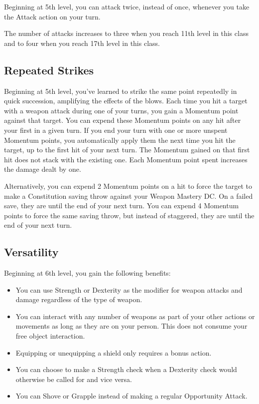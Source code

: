 Beginning at 5th level, you can attack twice, instead of once, whenever you take the Attack action on your turn.

The number of attacks increases to three when you reach 11th level in this class and to four when you reach 17th level in this class.

\subsection{Repeated Strikes}

Beginning at 5th level, you've learned to strike the same point repeatedly in quick succession, amplifying the effects of the blows. Each time you hit a target with a weapon attack during one of your turns, you gain a Momentum point against that target. You can expend these Momentum points on any hit after your first in a given turn. If you end your turn with one or more unspent Momentum points, you automatically apply them the next time you hit the target, up to the first hit of your next turn. The Momentum gained on that first hit does not stack with the existing one. Each Momentum point spent increases the damage dealt by one.

Alternatively, you can expend 2 Momentum points on a hit to force the target to make a Constitution saving throw against your Weapon Mastery DC. On a failed save, they are  until the end of your next turn. You can expend 4 Momentum points to force the same saving throw, but instead of staggered, they are  until the end of your next turn.

\subsection{Versatility}
Beginning at 6th level, you gain the following benefits:
\begin{itemize}
	\item You can use Strength or Dexterity as the modifier for weapon attacks and damage regardless of the type of weapon.
	\item You can interact with any number of weapons as part of your other actions or movements as long as they are on your person. This does not consume your free object interaction.
	\item Equipping or unequipping a shield only requires a bonus action.
	\item You can choose to make a Strength check when a Dexterity check would otherwise be called for and vice versa.
	\item You can Shove or Grapple instead of making a regular Opportunity Attack.
\end{itemize} 

